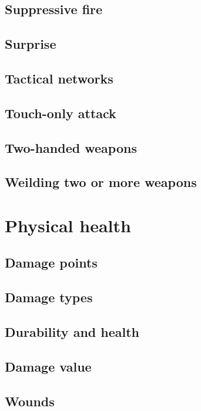 \subsection{Suppressive fire}

\subsection{Surprise}

\subsection{Tactical networks}

\subsection{Touch-only attack}

\subsection{Two-handed weapons}

\subsection{Weilding two or more weapons}

\section{Physical health}
\label{sec:physical-health}

\subsection{Damage points}

\subsection{Damage types}

\subsection{Durability and health}

\subsection{Damage value}

\subsection{Wounds}

